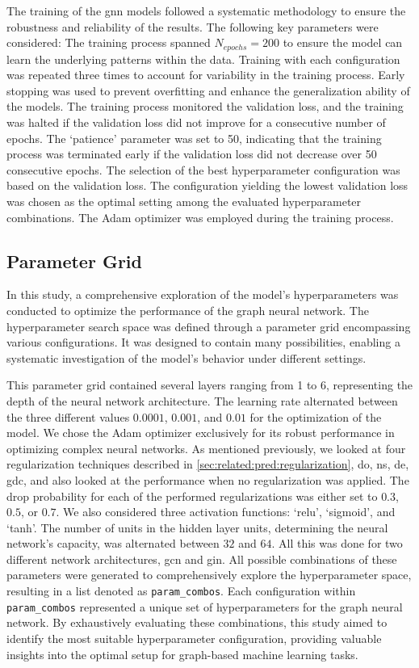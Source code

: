 The training of the \ac{gnn} models followed a systematic methodology to ensure the robustness and reliability of the results. The following key parameters were considered:
The training process spanned  $N_{epochs}= 200$ to ensure the model can learn the underlying patterns within the data.
Training with each configuration was repeated three times to account for variability in the training process.
Early stopping was used to prevent overfitting and enhance the generalization ability of the models. The training process monitored the validation loss, and the training was halted if the validation loss did not improve for a consecutive number of epochs.
The `patience' parameter was set to 50, indicating that the training process was terminated early if the validation loss did not decrease over 50 consecutive epochs.
The selection of the best hyperparameter configuration was based on the validation loss.
The configuration yielding the lowest validation loss was chosen as the optimal setting among the evaluated hyperparameter combinations.
The Adam optimizer was employed during the training process.

\subsection{Parameter Grid}
In this study, a comprehensive exploration of the model's hyperparameters was conducted to optimize the performance of the graph neural network.
The hyperparameter search space was defined through a parameter grid encompassing various configurations.
It was designed to contain many possibilities, enabling a systematic investigation of the model's behavior under different settings.

This parameter grid contained several layers ranging from 1 to 6, representing the depth of the neural network architecture.
The learning rate alternated between the three different values $0.0001$, $0.001$, and $0.01$ for the optimization of the model.
We chose the Adam optimizer exclusively for its robust performance in optimizing complex neural networks.
As mentioned previously, we looked at four regularization techniques described in \cref{sec:related:pred:regularization}, \ac{do}, \ac{ns}, \ac{de}, \ac{gdc}, and also looked at the performance when no regularization was applied.
The drop probability for each of the performed regularizations was either set to $0.3$, $0.5$, or $0.7$.
We also considered three activation functions: `relu', `sigmoid', and `tanh'.
The number of units in the hidden layer units, determining the neural network's capacity, was alternated between $32$ and $64$.
All this was done for two different network architectures, \ac{gcn} and \ac{gin}.
All possible combinations of these parameters were generated to comprehensively explore the hyperparameter space, resulting in a list denoted as \texttt{param_combos}.
Each configuration within \texttt{param_combos} represented a unique set of hyperparameters for the graph neural network. By exhaustively evaluating these combinations, this study aimed to identify the most suitable hyperparameter configuration, providing valuable insights into the optimal setup for graph-based machine learning tasks.

